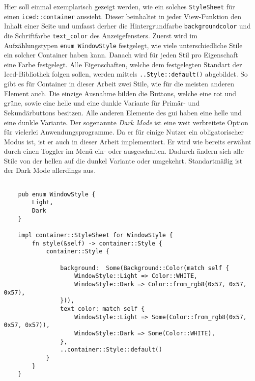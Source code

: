 Hier soll einmal exemplarisch gezeigt werden, wie ein solches \lstinline{StyleSheet} für einen \lstinline{iced::container} aussieht. Dieser beinhaltet in jeder View-Funktion den Inhalt einer Seite 
und umfasst derher die Hintergrundfarbe \lstinline{backgroundcolor} und die Schriftfarbe \lstinline{text_color} des Anzeigefensters. 
Zuerst wird im Aufzählungstypen \lstinline{enum WindowStyle} festgelegt, wie viele unterschiedliche Stile ein solcher Container haben kann. 
Danach wird für jeden Stil pro Eigenschaft eine Farbe festgelegt. Alle Eigenschaften, welche dem festgelegten Standart der Iced-Bibliothek folgen sollen, werden mittels 
\lstinline{..Style::default()} abgebildet. So gibt es für Container in dieser Arbeit zwei Stile, wie für die meisten anderen Element auch. Die einzige Ausnahme bilden die Buttons, welche eine rot und grüne, 
sowie eine helle und eine dunkle Variante für Primär- und Sekundärbuttons besitzen. 
Alle anderen Elemente des \ac{gui} haben eine helle und eine dunkle Variante. Der sogenannte \emph{Dark Mode} ist eine weit verbreitete Option für vielerlei Anwendungsprogramme. Da er für einige Nutzer ein obligatorischer Modus ist,
ist er auch in dieser Arbeit implementiert. Er wird wie bereits erwähnt durch einen Toggler im Menü ein- oder ausgeschalten. Dadurch ändern sich alle Stile von der hellen auf die dunkel Variante oder umgekehrt. 
Standartmäßig ist der Dark Mode allerdings aus.

\begin{lstlisting}
  
    pub enum WindowStyle {
        Light,
        Dark
    }

    impl container::StyleSheet for WindowStyle {
        fn style(&self) -> container::Style {
            container::Style { 
                
                background:  Some(Background::Color(match self {
                    WindowStyle::Light => Color::WHITE,
                    WindowStyle::Dark => Color::from_rgb8(0x57, 0x57, 0x57),
                })),
                text_color: match self {
                    WindowStyle::Light => Some(Color::from_rgb8(0x57, 0x57, 0x57)),
                    WindowStyle::Dark => Some(Color::WHITE),
                },
                ..container::Style::default()
            }
        }
    }

\end{lstlisting}

